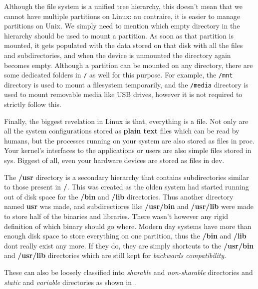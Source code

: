 Although the file system is a unified tree hierarchy, this doesn't mean that we cannot have multiple partitions on Linux: au contraire, it is easier to manage partitions on Unix.
We simply need to mention which empty directory in the hierarchy should be used to mount a partition.
As soon as that partition is mounted, it gets populated with the data stored on that disk with all the files and subdirectories, and when the device is unmounted the directory again becomes empty.
Although a partition can be mounted on any directory, there are some dedicated folders in \texttt{/} as well for this purpose.
For example, the \texttt{/mnt} directory is used to mount a filesystem temporarily, and the \texttt{/media} directory is used to mount removable media like USB drives, however it is not required to strictly follow this.

Finally, the biggest revelation in Linux is that, everything is a file.
Not only are all the system configurations stored as \textbf{plain text} files which can be read by humans, but the processes running on your system are also stored as files in proc.
Your kernel's interfaces to the applications or users are also simple files stored in sys.
Biggest of all, even your hardware devices are stored as files in dev.

The \textbf{/usr} directory is a secondary hierarchy that contains subdirectories similar to those present in \textbf{/}.
This was created as the olden system had started running out of disk space for the \textbf{/bin} and \textbf{/lib} directories.
Thus another directory named \textbf{usr} was made, and subdirectiores like \textbf{/usr/bin} and \textbf{/usr/lib} were made to store half of the binaries and libraries.
There wasn't however any rigid definition of which binary should go where.
Modern day systems have more than enough disk space to store everything on one partition, thus the \textbf{/bin} and \textbf{/lib} dont really exist any more. If they do, they are simply shortcuts
to the \textbf{/usr/bin} and \textbf{/usr/lib} directories which are still kept for \textit{backwards compatibility}.

These can also be loosely classified into \textit{sharable} and \textit{non-sharable} directories and \textit{static} and \textit{variable} directories as shown in .

